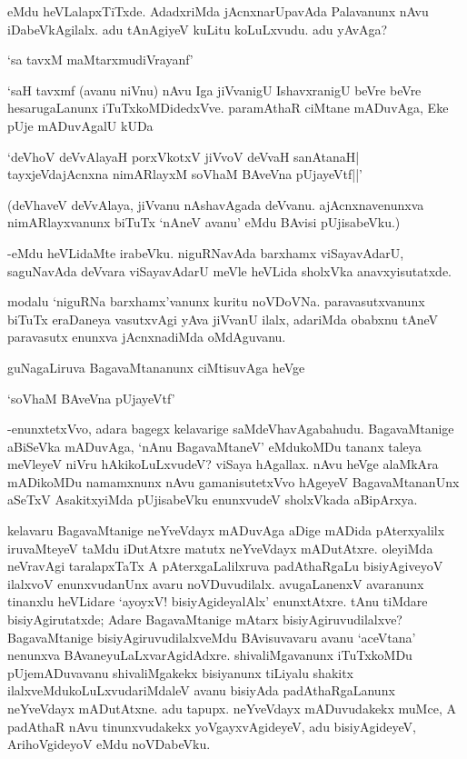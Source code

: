 eMdu heVLalapxTiTxde. AdadxriMda jAcnxnarUpavAda Palavanunx nAvu iDabeVkAgilalx. adu tAnAgiyeV kuLitu koLuLxvudu. adu yAvAga?

\begin{shloka}
`sa tavxM maMtarxmudiVrayanf'
\end{shloka}

`saH tavxmf (avanu niVnu) nAvu Iga jiVvanigU IshavxranigU beVre beVre hesarugaLanunx iTuTxkoMDidedxVve. paramAthaR ciMtane mADuvAga, Eke pUje mADuvAgalU kUDa

\begin{shloka}
`deVhoV deVvAlayaH porxVkotxV jiVvoV deVvaH sanAtanaH|\\
tayxjeVdajAcnxna nimARlayxM soV\s haM BAveVna pUjayeVtf||'
\end{shloka}

(deVhaveV deVvAlaya, jiVvanu nAshavAgada deVvanu. ajAcnxnavenunxva nimARlayxvanunx biTuTx `nAneV avanu' eMdu BAvisi pUjisabeVku.)

-eMdu heVLidaMte irabeVku. niguRNavAda barxhamx viSayavAdarU, saguNavAda deVvara viSayavAdarU meVle heVLida sholxVka anavxyisutatxde.

modalu `niguRNa barxhamx'vanunx kuritu noVDoVNa. paravasutxvanunx biTuTx eraDaneya vasutxvAgi yAva jiVvanU ilalx, adariMda obabxnu tAneV paravasutx enunxva jAcnxnadiMda oMdAguvanu.

guNagaLiruva BagavaMtananunx ciMtisuvAga heVge

\begin{shloka}
`soV\s haM BAveVna pUjayeVtf'
\end{shloka}

-enunxtetxVvo, adara bagegx kelavarige saMdeVhavAgabahudu. BagavaMtanige aBiSeVka mADuvAga, `nAnu BagavaMtaneV' eMdukoMDu tananx taleya meVleyeV niVru hAkikoLuLxvudeV? viSaya hAgallax. nAvu heVge alaMkAra mADikoMDu namamxnunx nAvu gamanisutetxVvo hAgeyeV BagavaMtananUnx aSeTxV AsakitxyiMda pUjisabeVku enunxvudeV sholxVkada aBipArxya.

kelavaru BagavaMtanige neYveVdayx mADuvAga aDige mADida pAterxyalilx iruvaMteyeV taMdu iDutAtxre matutx neYveVdayx mADutAtxre. oleyiMda neVravAgi taralapxTaTx A pAterxgaLalilxruva padAthaRgaLu bisiyAgiveyoV ilalxvoV enunxvudanUnx avaru noVDuvudilalx. avugaLanenxV avaranunx tinanxlu heVLidare `ayoyxV! bisiyAgideyalAlx' enunxtAtxre. tAnu tiMdare bisiyAgirutatxde; Adare BagavaMtanige mAtarx bisiyAgiruvudilalxve? BagavaMtanige bisiyAgiruvudilalxveMdu BAvisuvavaru avanu `aceVtana' nenunxva BAvaneyuLaLxvarAgidAdxre. shivaliMgavanunx iTuTxkoMDu pUjemADuvavanu shivaliMgakekx bisiyanunx tiLiyalu shakitx ilalxveMdukoLuLxvudariMdaleV avanu bisiyAda padAthaRgaLanunx neYveVdayx mADutAtxne. adu tapupx. neYveVdayx mADuvudakekx muMce, A padAthaR nAvu tinunxvudakekx yoVgayxvAgideyeV, adu bisiyAgideyeV, ArihoVgideyoV eMdu noVDabeVku.


